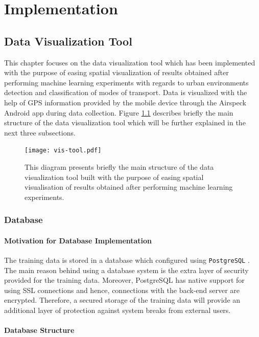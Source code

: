 \documentclass[bsc,frontabs,twoside,singlespacing, parskip,deptreport]{infthesis}     %
\begin{document}
\chapter{Implementation}

\section{Data Visualization Tool}
\label{sec:data-visualization-tool}

This chapter focuses on the data visualization tool which has been implemented with the purpose of easing spatial visualization of results obtained after performing machine learning experiments with regards to urban environments detection and classification of modes of transport. Data is visualized with the help of GPS information provided by the mobile device through the Airspeck Android app during data collection. Figure \ref{fig:vis-tool} describes briefly the main structure of the data visualization tool which will be further explained in the next three subsections.

\begin{figure}[h!]
  \center
  \texttt{[image: vis-tool.pdf]}
  \caption{This diagram presents briefly the main structure of the data visualization tool built with the purpose of easing spatial visualisation of results obtained after performing machine learning experiments.}
  \label{fig:vis-tool}
\end{figure}


\subsection{Database}
\label{subsec:database}

\subsubsection*{Motivation for Database Implementation}

The training data is stored in a database which configured using \texttt{PostgreSQL} \cite{postgres}. The main reason behind using a database system is the extra layer of security provided for the training data. Moreover, PostgreSQL has native support for using SSL connections and hence, connections with the back-end server are encrypted. Therefore, a secured storage of the training data will provide an additional layer of protection against system breaks from external users.

\subsubsection*{Database Structure}
\end{document}
